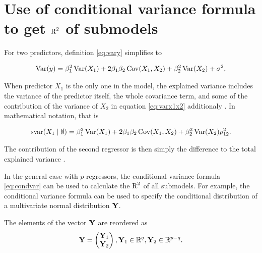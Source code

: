 \documentclass[11pt,a4paper,twoside]{book}
\begin{document}
\section{Use of conditional variance formula to get $\text{R}^2$ of submodels}


For two predictors, definition \eqref{eq:vary} simplifies to

      \begin{align} 
        \operatorname{Var}(y) = \beta_{1}^2 \operatorname{Var}(X_{1}) + 2  \beta_{1}  \beta_{2} \operatorname{Cov}(X_{1}, X_{2}) + \beta_{2}^2 \operatorname{Var}(X_{2}) + \sigma^2, \label{eq:varx1x2} 
   \end{align}
 
 When predictor $X_{1}$ is the only one in the model, the explained variance includes the variance of the predictor itself, the whole covariance term, and some of the contribution of the variance of $X_{2}$ in equation \eqref{eq:varx1x2} additionaly . In mathematical notation, that is
 
      \begin{align} 
        \text{svar}({X_{1}} \mid \emptyset ) = \beta_{1}^2 \operatorname{Var}(X_{1}) + 2  \beta_{1}  \beta_{2} \operatorname{Cov}(X_{1}, X_{2}) + \beta_{2}^2 \operatorname{Var}(X_{2}) \rho_{12}^2 \text{.} \nonumber 
   \end{align}
   
The contribution of the second regressor is then simply the difference to the total explained variance \citep{Gromping2007}. 

In the general case with $p$ regressors, the conditional variance formula \eqref{eq:condvar} can be used to calculate the $\text{R}^2$ of all submodels. For example, the conditional variance formula can be used to specify the conditional distribution of a multivariate normal distribution ${\mathbf{Y}}$.

The elements of the vector ${\mathbf{Y}}$ are reordered as
\begin{align*}
\mathbf{Y} = \begin{pmatrix}
\mathbf{Y}_{1} \\ 
\mathbf{Y}_{2} \end{pmatrix}, \mathbf{Y}_{1} \in {\mathbb{R}}^q, \mathbf{Y}_{2} \in {\mathbb{R}}^{p-q} .
\end{align*}
\end{document}
